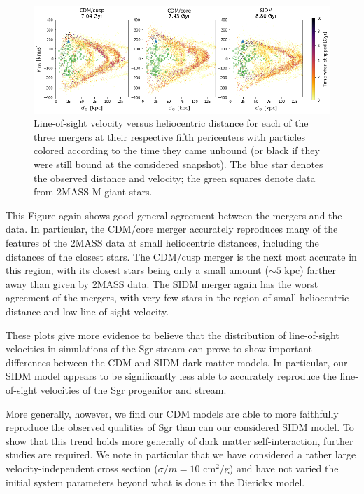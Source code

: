 \begin{figure}
    \centering
    \includegraphics[width=1.0\linewidth]{figs/vel_v_dist_2mass.png}
    \caption{%
        Line-of-sight velocity versus heliocentric distance for each of the
        three mergers at their respective fifth pericenters with particles
        colored according to the time they came unbound (or black if they were
        still bound at the considered snapshot).  The blue star denotes the
        observed distance and velocity; the green squares denote data from
        2MASS M-giant stars.
    }
    \label{fig:vel_v_d_2mass}
\end{figure}

This Figure again shows good general agreement between the mergers and the
data.  In particular, the CDM/core merger accurately reproduces many of the
features of the 2MASS data at small heliocentric distances, including the
distances of the closest stars.  The CDM/cusp merger is the next most accurate
in this region, with its closest stars being only a small amount ($\sim 5$
kpc) farther away than given by 2MASS data.  The SIDM merger again has the
worst agreement of the mergers, with very few stars in the region of small
heliocentric distance and low line-of-sight velocity.

These plots give more evidence to believe that the distribution of
line-of-sight velocities in simulations of the Sgr stream can prove to show
important differences between the CDM and SIDM dark matter models. In
particular, our SIDM model appears to be significantly less able to accurately
reproduce the line-of-sight velocities of the Sgr progenitor and stream.

More generally, however, we find our CDM models are able to more faithfully
reproduce the observed qualities of Sgr than can our considered SIDM model.
To show that this trend holds more generally of dark matter self-interaction,
further studies are required.  We note in particular that we have considered a
rather large velocity-independent cross section ($\sigma/m = 10$ cm$^2$/g) and
have not varied the initial system parameters beyond what is done in the
Dierickx model.


